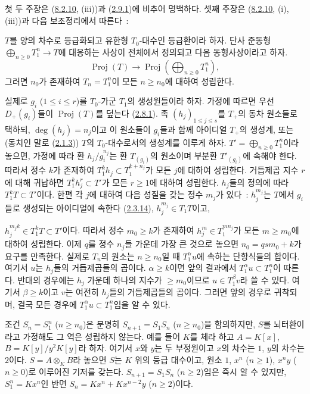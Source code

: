 첫 두 주장은 (\hyperref[II.8.2.10-ko]{8.2.10}, (iii))과
(\hyperref[II.2.9.1-ko]{2.9.1})에 비추어 명백하다. 셋째 주장은
(\hyperref[II.8.2.10-ko]{8.2.10}, (i), (iii))과 다음 보조정리에서
따른다~:

\begin{lemma}[8.2.14.1]
\label{II.8.2.14.1-ko}
$T$를 양의 차수로 등급화되고 유한형 $T_0$-대수인 등급환이라 하자.
단사 준동형 $\bigoplus_{n\geq0}T_1^n\to T$에 대응하는 사상이 전체에서
정의되고 다음 동형사상이라고 하자.
\[
  \operatorname{Proj}(T)\to
  \operatorname{Proj}\left(\bigoplus_{n\geq0}T_1^n\right),
\]
그러면 $n_0$가 존재하여 $T_n=T_1^n$이 모든 $n\geq n_0$에 대하여
성립한다.
\end{lemma}

실제로 $g_i$ ($1\leq i\leq r$)를 $T_0$-가군 $T_1$의 생성원들이라 하자.
가정에 따르면 우선 $D_+(g_i)$들이 $\operatorname{Proj}(T)$를 덮는다
(\hyperref[II.2.8.1-ko]{2.8.1}). 족 $(h_j)_{1\leq j\leq s}$를
$T_+$의 동차 원소들로 택하되, $\deg(h_j)=n_j$이고 이 원소들이
$g_i$들과 함께 아이디얼 $T_+$의 생성계, 또는 (동치인 말로
(\hyperref[II.2.1.3-ko]{2.1.3})) $T$의 $T_0$-대수로서의 생성계를 이루게
하자. $T'=\bigoplus_{n\geq0}T_1^n$이라 놓으면, 가정에 따라 환
$h_j/g_i^{n_j}$는 환 $T_{(g_i)}$의 원소이며 부분환 $T'_{(g_i)}$에
속해야 한다. 따라서 정수 $k$가 존재하여
$T_1^k h_j\subset T_1^{k+n_j}$가 모든 $j$에 대하여 성립한다.
거듭제곱 지수 $r$에 대해 귀납하면 $T_1^k h_j^r\subset T'$가 모든
$r\geq1$에 대하여 성립한다. $h_j$들의 정의에
따라 $T_1^kT\subset T'$이다. 한편 각 $j$에 대하여 다음 성질을 갖는
정수 $m_j$가 있다~: $h_j^{m_j}$는 $T$에서
$g_i$들로 생성되는 아이디얼에 속한다
(\hyperref[II.2.3.14-ko]{2.3.14}), $h_j^{m_j}\in T_1T$이고,

$h_j^{m_jk}\in T_1^kT\subset T'$이다. 따라서 정수 $m_0\geq k$가
존재하여 $h_j^m\in T_1^{mn_j}$가 모든 $m\geq m_0$에 대하여 성립한다. 이제
$q$를 정수 $n_j$들 가운데 가장 큰 것으로 놓으면 $n_0=qsm_0+k$가
요구를 만족한다. 실제로 $T_n$의 원소는 $n\geq n_0$일 때
$T_1^\alpha u$에 속하는 단항식들의 합이다. 여기서 $u$는 $h_j$들의
거듭제곱들의 곱이다. $\alpha\geq k$이면 앞의 결과에서
$T_1^\alpha u\subset T_1^n$이 따른다. 반대의 경우에는 $h_j$ 가운데
하나의 지수가 $\geq m_0$이므로 $u\in T_1^\beta v$라 쓸 수 있다.
여기서 $\beta\geq k$이고 $v$는 여전히 $h_j$들의 거듭제곱들의 곱이다.
그러면 앞의 경우로 귀착되며, 결국 모든 경우에
$T_1^\alpha u\subset T_1^n$임을 알 수 있다.

\begin{remark}[8.2.15]
\label{II.8.2.15-ko}
조건 $S_n=S_1^n$ ($n\geq n_0$)은 분명히
$S_{n+1}=S_1S_n$ ($n\geq n_0$)을 함의하지만, $S$를 뇌터환이라고
가정해도 그 역은
성립하지 않는다. 예를 들어 $K$를 체라 하고
$A=K[x]$, $B=K[y]/y^2K[y]$라 하자. 여기서 $x$와 $y$는 두 부정원이고
$x$의 차수는 $1$, $y$의 차수는 $2$이다. $S=A\otimes_KB$라 놓으면
$S$는 $K$ 위의 등급 대수이고, 원소 $1$, $x^n$ ($n\geq1$),
$x^ny$ ($n\geq0$)로 이루어진 기저를 갖는다.
$S_{n+1}=S_1S_n$ ($n\geq2$)임은 즉시 알 수 있지만,
$S_1^n=Kx^n$인 반면 $S_n=Kx^n+Kx^{n-2}y$ ($n\geq2$)이다.
\end{remark}

